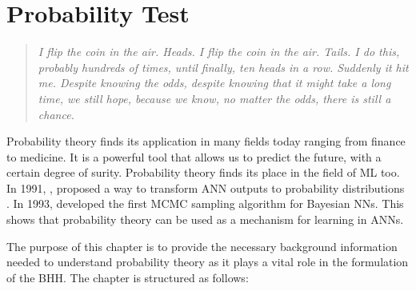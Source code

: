 \chapter{Probability Test}
\label{chap:probability}

\begin{quotation}
    \textit{I flip the coin in the air. Heads. I flip the coin in the air.
        Tails. I do this, probably hundreds of times, until finally, ten heads
        in a row. Suddenly it hit me. Despite knowing the odds, despite knowing
        that it might take a long time, we still hope, because we know, no
    matter the odds, there is still a chance.}
\end{quotation}

Probability theory finds its application in many fields today ranging from
finance to medicine. It is a powerful tool that allows us to predict the
future, with a certain degree of surity. Probability theory finds its place in
the field of \ac{ML} too. In 1991,
\citeauthor{ref:denker:1991}, \cite{ref:denker:1991} proposed a way to transform
\ac{ANN} outputs to probability distributions . In 1993,
\citeauthor{ref:neal:1993} \cite{ref:neal:1993} developed the first \ac{MCMC}
sampling algorithm for Bayesian \acp{NN}. This shows that probability theory
can be used as a mechanism for learning in \acp{ANN}.

The purpose of this chapter is to provide the necessary background information
needed to understand probability theory as it plays a vital role in the
formulation of the \ac{BHH}.  The chapter is structured as follows:

